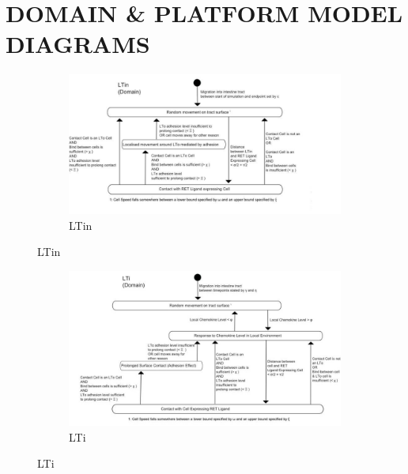 \documentclass{UoYCSproject}
\begin{document}
%

%

\chapter{DOMAIN \& PLATFORM MODEL DIAGRAMS}

\begin{figure}[htp]
\centering
\begin{subfigure}{0.95\textwidth}
\centering
\includegraphics[width=\textwidth]{Appendix/Models/Domain/LTin}
\caption{LTin}
\end{subfigure}
\end{figure}

\begin{figure}[htp]\ContinuedFloat
\centering
\begin{subfigure}{0.95\textwidth}
\centering
\includegraphics[width=\textwidth]{Appendix/Models/Domain/LTi}
\caption{LTi}
\end{subfigure}
\end{figure}
\end{document}
